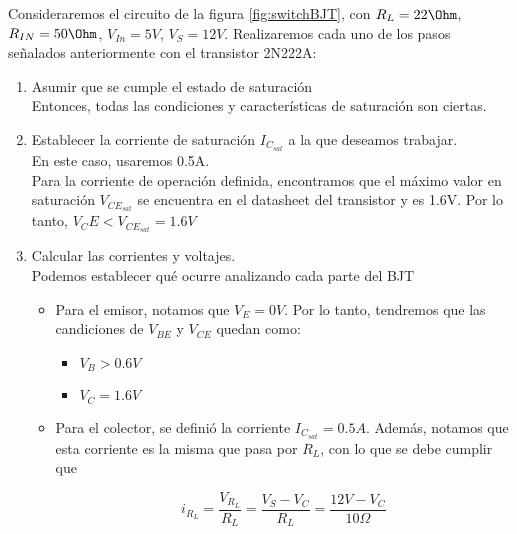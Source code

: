 \documentclass[11pt,fancy,lang=es]{elegantbook}
\begin{document}
\begin{example}


    Consideraremos el circuito de la figura \ref{fig:switchBJT}, con $R_L=22\Ohm$,$R_{IN}=50\Ohm$, $V_{In}=5V$, $V_S=12V$. Realizaremos cada uno de los pasos señalados anteriormente con el transistor 2N222A:

    \begin{enumerate}
        \item Asumir que se cumple el estado de saturación\\
              Entonces, todas las condiciones y características de saturación son ciertas.

        \item Establecer la corriente de saturación $I_{C_{sat}}$ a la que deseamos trabajar. \\
              En este caso, usaremos 0.5A.\\

              Para la corriente de operación definida, encontramos que el máximo valor en saturación $V_{CE_{sat}}$ se encuentra en el datasheet del transistor y es 1.6V.
              Por lo tanto, $V_CE<V_{CE_{sat}}=1.6V$

        \item Calcular las corrientes y voltajes.\\
              Podemos establecer qué ocurre analizando cada parte del BJT
              \begin{itemize}
                  \item Para el emisor, notamos que $V_E=0V$. Por lo tanto, tendremos que las candiciones de $V_{BE}$ y $V_{CE}$ quedan como:
                        \begin{itemize}
                            \item $V_B>0.6V$
                            \item $V_C=1.6V$
                        \end{itemize}
                  \item Para el colector, se definió la corriente $I_{C_{sat}}=0.5A$. Además, notamos que esta corriente es la misma que pasa por $R_L$, con lo que se debe cumplir que

                        \begin{equation}
                            i_{R_L}=\frac{V_{R_L}}{R_L}=\frac{V_S-V_C}{R_L}=\frac{12V-V_C}{10\Omega}
                        \end{equation}


\end{itemize}
\end{enumerate}
\end{example}
\end{document}
